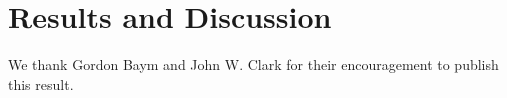 \documentclass[sn-mathphys,Numbered]{sn-jnl}
\theoremstyle{thmstyleone}%
\theoremstyle{thmstyletwo}%
\theoremstyle{thmstylethree}%
\begin{document}
\section{Results and Discussion}\label{sec12}






 

\backmatter


We thank Gordon Baym and John W. Clark for their encouragement to publish this result.


\end{document}
